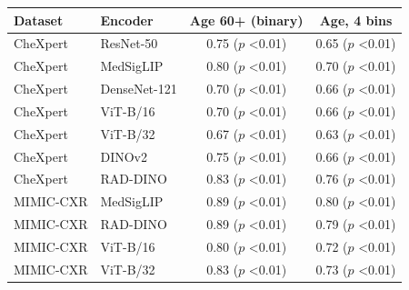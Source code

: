 \begin{tabular}{llcc}
\toprule
Dataset & Encoder & Age 60+ (binary) & Age, 4 bins \\
\midrule
CheXpert & ResNet-50 & 0.75 ($p$ <0.01) & 0.65 ($p$ <0.01) \\
CheXpert & MedSigLIP & 0.80 ($p$ <0.01) & 0.70 ($p$ <0.01) \\
CheXpert & DenseNet-121 & 0.70 ($p$ <0.01) & 0.66 ($p$ <0.01) \\
CheXpert & ViT-B/16 & 0.70 ($p$ <0.01) & 0.66 ($p$ <0.01) \\
CheXpert & ViT-B/32 & 0.67 ($p$ <0.01) & 0.63 ($p$ <0.01) \\
CheXpert & DINOv2 & 0.75 ($p$ <0.01) & 0.66 ($p$ <0.01) \\
CheXpert & RAD-DINO & 0.83 ($p$ <0.01) & 0.76 ($p$ <0.01) \\
\midrule
MIMIC-CXR & MedSigLIP & 0.89 ($p$ <0.01) & 0.80 ($p$ <0.01) \\
MIMIC-CXR & RAD-DINO & 0.89 ($p$ <0.01) & 0.79 ($p$ <0.01) \\
MIMIC-CXR & ViT-B/16 & 0.80 ($p$ <0.01) & 0.72 ($p$ <0.01) \\
MIMIC-CXR & ViT-B/32 & 0.83 ($p$ <0.01) & 0.73 ($p$ <0.01) \\
\bottomrule
\end{tabular}
